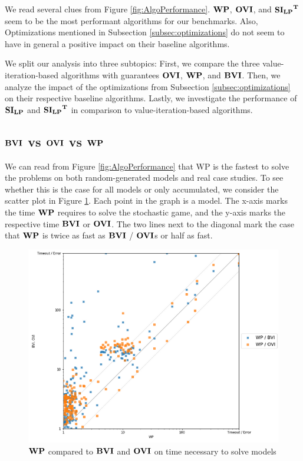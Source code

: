 
We read several clues from Figure \ref{fig:AlgoPerformance}. 
$\WP$, $\OVI$, and $\mathbf{\mathbf{SI_{LP}}^T}$ seem to be the most performant algorithms for our benchmarks. 
Also, Optimizations mentioned in Subsection \ref{subsec:optimizations} do not seem to have in general a positive impact on their baseline algorithms.

We split our analysis into three subtopics: 
First, we compare the three value-iteration-based algorithms with guarantees $\OVI$, $\WP$, and $\BVI$. 
Then, we analyze the impact of the optimizations from Subsection \ref{subsec:optimizations} on their respective baseline algorithms.
Lastly, we investigate the performance of $\mathbf{SI_{LP}}$ and $\mathbf{\mathbf{SI_{LP}}^T}$ in comparison to value-iteration-based algorithms.


\subsection{$\BVI$ vs $\OVI$ vs $\WP$}
We can read from Figure \ref{fig:AlgoPerformance} that WP is the fastest to solve the problems on both random-generated models and real case studies.
To see whether this is the case for all models or only accumulated, we consider the scatter plot in Figure \ref{fig:WPvsBVIandOVIonRandomRandom}.
Each point in the graph is a model. The x-axis marks the time $\WP$ requires to solve the stochastic game, and the y-axis marks the respective time $\BVI$ or $\OVI$.
The two lines next to the diagonal mark the case that $\WP$ is twice as fast as $\BVI$ / $\OVI$s or half as fast.

\begin{figure}[t]
    \centering
    \includegraphics[width=1\textwidth]{figures/WPvsBVIandOVIonAll.png}
    \caption[$\WP$ compared to $\BVI$ and $\OVI$ on time necessary to solve models]{
        $\WP$ compared to $\BVI$ and $\OVI$ on time necessary to solve models
    }
    \label{fig:WPvsBVIandOVIonRandomRandom}
\end{figure}

